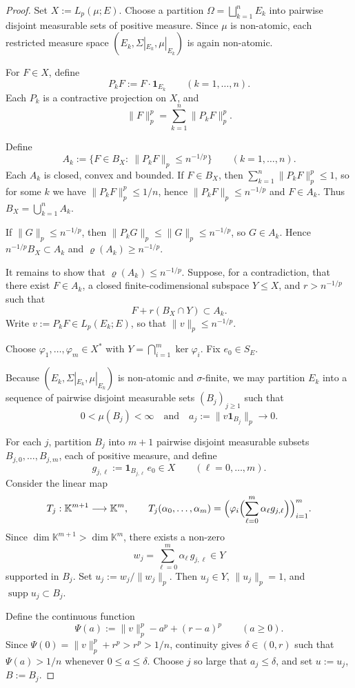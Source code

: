 \documentclass[reqno,11pt]{amsart}
\theoremstyle{plain}
\theoremstyle{definition}
\theoremstyle{remark}
\newcommand{\K}{\mathbb{K}}
\renewcommand{\le}{\leqslant}
\renewcommand{\ge}{\geqslant}
\begin{document}
\begin{proof}
Set $X:=L_p(\mu;E)$.  Choose a partition
$\Omega=\bigsqcup_{k=1}^n E_k$ into pairwise disjoint measurable sets of
positive measure. Since $\mu$ is non-atomic, each restricted measure space
$(E_k,\Sigma|_{E_k},\mu|_{E_k})$ is again non-atomic.

For $F\in X$, define
\[
P_k F := F\cdot\mathbf{1}_{E_k}\qquad(k=1,\dots,n).
\]
Each $P_k$ is a contractive projection on $X$, and
\[
\|F\|_p^p = \sum_{k=1}^n \|P_k F\|_p^p.
\]

Define
\[
A_k := \bigl\{F\in B_X:\ \|P_k F\|_p\le n^{-1/p}\bigr\}
\qquad(k=1,\dots,n).
\]
Each $A_k$ is closed, convex and bounded.  If $F\in B_X$, then
$\sum_{k=1}^n \|P_k F\|_p^p\le 1$, so for some $k$ we have
$\|P_k F\|_p^p\le 1/n$, hence $\|P_k F\|_p\le n^{-1/p}$ and $F\in A_k$.
Thus $B_X=\bigcup_{k=1}^n A_k$.

If $\|G\|_p\le n^{-1/p}$, then $\|P_k G\|_p\le\|G\|_p\le n^{-1/p}$, so
$G\in A_k$.  Hence $n^{-1/p}B_X\subset A_k$ and $\varrho(A_k)\ge n^{-1/p}$.

It remains to show that $\varrho(A_k)\le n^{-1/p}$.  Suppose, for a
contradiction, that there exist $F\in A_k$, a closed finite-codimensional
subspace $Y\le X$, and $r>n^{-1/p}$ such that
\[
F + r(B_X\cap Y)\subset A_k.
\]
Write $v:=P_k F\in L_p(E_k;E)$, so that $\|v\|_p\le n^{-1/p}$.

Choose $\varphi_1,\dots,\varphi_m\in X^*$ with
$Y=\bigcap_{i=1}^m\ker\varphi_i$.  Fix $e_0\in S_E$.

Because $(E_k,\Sigma|_{E_k},\mu|_{E_k})$ is non-atomic and $\sigma$-finite,
we may partition $E_k$ into a sequence of pairwise disjoint measurable sets
$(B_j)_{j\ge1}$ such that
\[
0<\mu(B_j)<\infty
\quad\text{and}\quad
a_j:=\|v\mathbf{1}_{B_j}\|_p\to 0.
\]

For each $j$, partition $B_j$ into $m+1$ pairwise disjoint measurable
subsets $B_{j,0},\dots,B_{j,m}$, each of positive measure, and define
\[
g_{j,\ell} := \mathbf{1}_{B_{j,\ell}}\,e_0\in X
\qquad(\ell=0,\dots,m).
\]
Consider the linear map
\[
T_j:\K^{m+1}\longrightarrow\K^m,\qquad
T_j(\alpha_0,\dots,\alpha_m)
=
\Bigl(\varphi_i\Bigl(\sum_{\ell=0}^m \alpha_\ell g_{j,\ell}\Bigr)\Bigr)_{i=1}^m.
\]
Since $\dim\K^{m+1}>\dim\K^m$, there exists a non-zero
\[
w_j = \sum_{\ell=0}^m \alpha_\ell\,g_{j,\ell}\in Y
\]
supported in $B_j$.  Set $u_j:=w_j/\|w_j\|_p$.  Then $u_j\in Y$,
$\|u_j\|_p=1$, and $\operatorname{supp} u_j\subset B_j$.

Define the continuous function
\[
\Psi(a) := \|v\|_p^p - a^p + (r-a)^p\qquad(a\ge0).
\]
Since $\Psi(0)=\|v\|_p^p+r^p>r^p>1/n$, continuity gives
$\delta\in(0,r)$ such that $\Psi(a)>1/n$ whenever $0\le a\le\delta$.
Choose $j$ so large that $a_j\le\delta$, and set $u:=u_j$, $B:=B_j$.


\end{proof}
\end{document}
